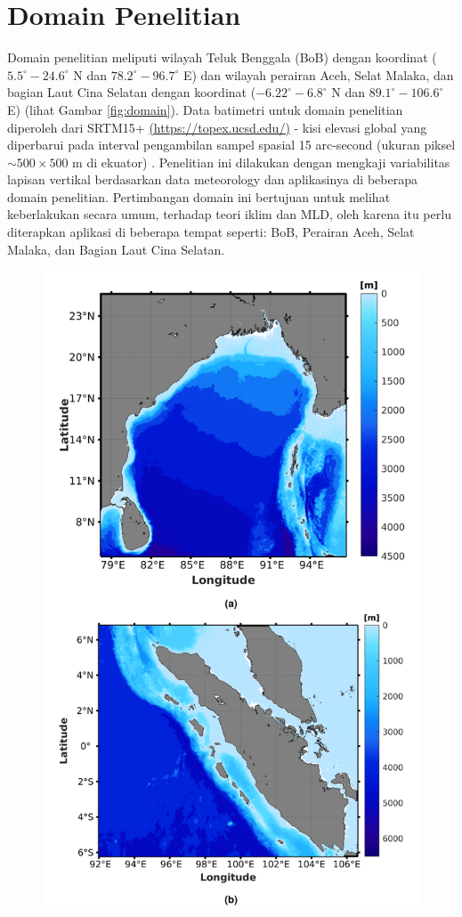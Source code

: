 \vspace{1.5pc}
\section[Domain Penelitian]{Domain Penelitian}
\begin{spacing}{1.5}
	Domain penelitian meliputi wilayah Teluk Benggala (BoB) dengan koordinat ($5.5^\circ-24.6^\circ$ N dan $78.2^\circ-96.7^\circ$ E) dan wilayah perairan Aceh, Selat Malaka, dan bagian Laut Cina Selatan dengan koordinat ($-6.22^\circ-6.8^\circ$ N dan $89.1^\circ-106.6^\circ$ E) (lihat Gambar \ref{fig:domain}). Data batimetri untuk domain penelitian diperoleh dari SRTM15+ \href{https://topex.ucsd.edu/pub/archive/srtm15/V1/}{(https://topex.ucsd.edu/)} - kisi elevasi global yang diperbarui pada interval pengambilan sampel spasial 15 arc-second (ukuran piksel $\sim 500 \times 500$ m di ekuator) . Penelitian ini dilakukan dengan mengkaji variabilitas lapisan vertikal berdasarkan data meteorology dan aplikasinya di beberapa domain penelitian. Pertimbangan domain ini bertujuan untuk melihat keberlakukan secara umum, terhadap teori iklim dan MLD, oleh karena itu perlu diterapkan aplikasi di beberapa tempat seperti: BoB, Perairan Aceh, Selat Malaka, dan Bagian Laut Cina Selatan.
	\begin{figure}[H]
		\centering
		\includegraphics[width=12cm]{contents/Topo}

\end{figure}
\end{spacing}
